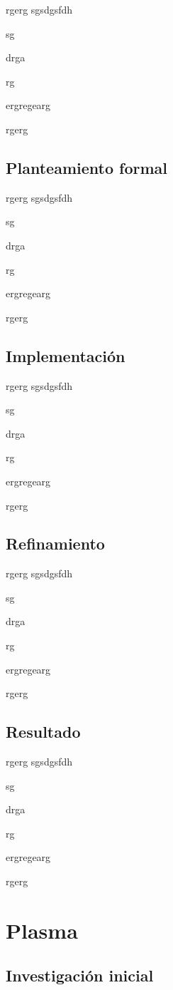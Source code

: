 rgerg
sgsdgsfdh

sg

drga

rg

ergregearg

rgerg

\subsection{Planteamiento formal}

rgerg
sgsdgsfdh

sg

drga

rg

ergregearg

rgerg

\subsection{Implementación}

rgerg
sgsdgsfdh

sg

drga

rg

ergregearg

rgerg

\subsection{Refinamiento}

rgerg
sgsdgsfdh

sg

drga

rg

ergregearg

rgerg

\subsection{Resultado}

rgerg
sgsdgsfdh

sg

drga

rg

ergregearg

rgerg


\section{Plasma}

\subsection{Investigación inicial}

